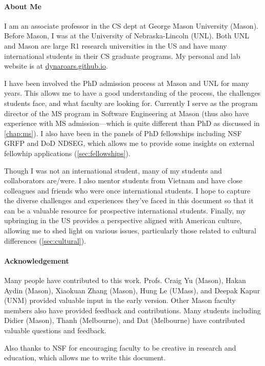 \documentclass[oneside,11pt,dvipsnames]{book}
\begin{document}
\paragraph{About Me} I am an associate professor in the CS dept at George Mason University (Mason). Before Mason, I was at the University of Nebraska-Lincoln (UNL). Both UNL and Mason are large R1 research universities in the US and have many international students in their CS graduate programs. My personal and lab website is at \href{https://dynaroars.github.io}{dynaroars.github.io}.

I have been involved the PhD admission process at Mason and UNL for many years. This allows me to have a good understanding of the process, the challenges students face, and what faculty are looking for. Currently I serve as the program director of the MS program in Software Engineering at Mason (thus also have experience with MS admission---which is quite different than PhD as discussed in \autoref{chap:ms}). I also have been in the panels of PhD fellowships including NSF GRFP and DoD NDSEG, which allows me to provide some insights on external fellowhip applications (\autoref{sec:fellowships}).


Though I was not an international student, many of my students and collaborators are/were. I also mentor students from Vietnam and have close colleagues and friends who were once international students. I hope to capture the diverse challenges and experiences they've faced in this document so that it can be a valuable resource for prospective international students.
Finally, my upbringing in the US provides a perspective aligned with American culture, allowing me to shed light on various issues, particularly those related to cultural differences (\autoref{sec:cultural}).




\paragraph{Acknowledgement} Many people have contributed to this work.
Profs. Craig Yu (Mason), Hakan Aydin (Mason), 
Xiaokuan Zhang (Mason), Hung Le (UMass), and Deepak Kapur (UNM) provided valuable input in the early version. Other Mason faculty members also have provided feedback and contributions.  Many students including Didier (Mason), Thanh (Melbourne), and Dat (Melbourne) have contributed valuable questions and feedback. 

Also thanks to NSF for encouraging faculty to be creative in research and education, which allows me to write this document. 



%
%
\end{document}
